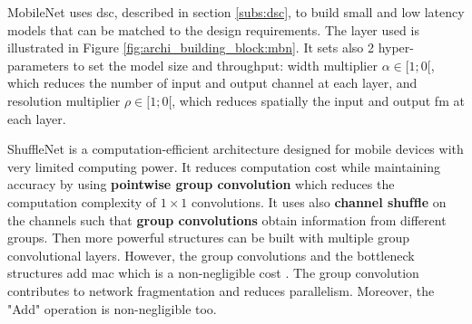 MobileNet \cite{howard_mobilenets_2017} uses \acrshort{dsc}, described in section \ref{subs:dsc}, to build small and low latency models that can be matched to the design requirements. The layer used is illustrated in Figure \ref{fig:archi_building_block:mbn}. It sets also 2 hyper-parameters to set the model size and throughput: width multiplier $\alpha \in [1; 0[$, which reduces the number of input and output channel at each layer, and resolution multiplier $\rho \in [1; 0[$,  which reduces spatially the input and output \acrshort{fm} at each layer.

ShuffleNet \cite{zhang_shufflenet_2018} is a computation-efficient architecture designed for mobile devices with very limited computing power. It reduces computation cost while maintaining accuracy by using \textbf{pointwise group convolution} which reduces the computation complexity of $1 \times 1$ convolutions. It uses also \textbf{channel shufﬂe} on the channels such that \textbf{group convolutions} obtain information from different groups. Then more powerful structures can be built with multiple group convolutional layers. However, the group convolutions and the bottleneck structures add \acrshort{mac} which is a non-negligible cost \cite{ma_shufflenet_2018}. The group convolution contributes to network fragmentation and reduces parallelism. Moreover, the "Add" operation is non-negligible too.

